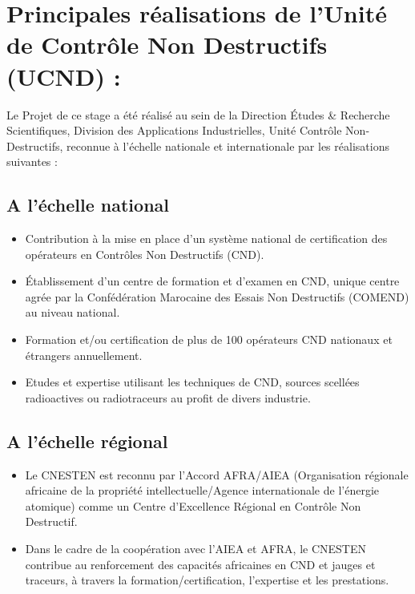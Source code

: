 \documentclass{report}
\newenvironment{mystyle}{
	\setlength{\parindent}{0pt} %
	\setlength{\parskip}{10pt} %
	\fontsize{12pt}{14pt}\selectfont %
}{
}
\begin{document}
	\section{Principales réalisations de l’Unité de Contrôle Non Destructifs (UCND) :}
		\begin{mystyle}
			Le Projet de ce stage   a été réalisé au sein de la Direction Études & Recherche Scientifiques, Division des Applications Industrielles, Unité Contrôle Non-Destructifs, reconnue à l’échelle nationale et internationale par les réalisations suivantes :
		\end{mystyle}
		
	\subsection{A l’échelle national}
		\begin{mystyle}
				\begin{itemize}
					\item Contribution à la mise en place d'un système national de certification des opérateurs en Contrôles Non Destructifs (CND).
					
					\item Établissement d'un centre de formation et d'examen en CND, unique centre agrée par la Confédération Marocaine des Essais Non Destructifs (COMEND) au niveau national.
					
					\item  Formation et/ou certification de plus de 100 opérateurs CND nationaux et étrangers annuellement.
					
					\item Etudes et expertise utilisant les techniques de CND, sources scellées radioactives ou radiotraceurs au profit de divers industrie.
				\end{itemize}
		\end{mystyle}
		
		\subsection{A l’échelle régional}
		\begin{mystyle}
			\begin{itemize}
				\item Le CNESTEN est reconnu par l’Accord AFRA/AIEA (Organisation régionale africaine de la propriété intellectuelle/Agence internationale de l'énergie atomique) comme un Centre d’Excellence Régional en Contrôle Non Destructif.
				
				
				\item Dans le cadre de la coopération avec l’AIEA et AFRA, le CNESTEN contribue au renforcement des capacités africaines en CND et jauges et traceurs, à travers la formation/certification, l’expertise et les prestations.   
			\end{itemize}
		\end{mystyle}
\end{document}
